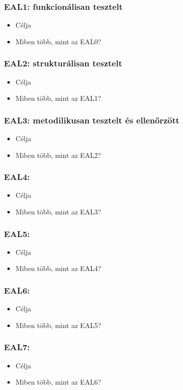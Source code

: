 \subsubsection{EAL1: funkcionálisan tesztelt}
\begin{itemize}
    \item{Célja}
    \item{Miben több, mint az EAL0?}
\end{itemize}

\subsubsection{EAL2: strukturálisan tesztelt}
\begin{itemize}
    \item{Célja}
    \item{Miben több, mint az EAL1?}
\end{itemize}
\subsubsection{EAL3: metodilikusan tesztelt és ellenőrzött}
\begin{itemize}
    \item{Célja}
    \item{Miben több, mint az EAL2?}
\end{itemize}
\subsubsection{EAL4: }
\begin{itemize}
    \item{Célja}
    \item{Miben több, mint az EAL3?}
\end{itemize}
\subsubsection{EAL5:}
\begin{itemize}
    \item{Célja}
    \item{Miben több, mint az EAL4?}
\end{itemize}
\subsubsection{EAL6:}
\begin{itemize}
    \item{Célja}
    \item{Miben több, mint az EAL5?}
\end{itemize}
\subsubsection{EAL7:}
\begin{itemize}
    \item{Célja}
    \item{Miben több, mint az EAL6?}
\end{itemize}
